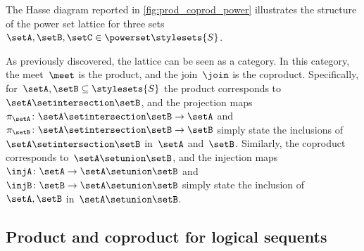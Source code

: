 \begin{marginfigure}
    \centering
    \caption{}
    \label{fig:prod_coprod_power}
\end{marginfigure}

The Hasse diagram reported in \cref{fig:prod_coprod_power} illustrates the structure of the power set lattice for three sets~$\setA,\setB,\setC\in \powerset \stylesets{S}$.

As previously discovered, the lattice can be seen as a category.
In this category, the meet~$\meet$ is the product, and the join~$\join$ is the coproduct.
Specifically, for~$\setA,\setB\subseteq \stylesets{S}$ the product corresponds to~$\setA\setintersection \setB$, and the projection maps~$\pi_\setA\colon \setA\setintersection \setB\to \setA$ and~$\pi_\setB\colon \setA\setintersection \setB\to \setB$ simply state the inclusions of~$\setA\setintersection \setB$ in~$\setA$ and~$\setB$.
Similarly, the coproduct corresponds to~$\setA\setunion \setB$, and the injection maps~$\injA\colon \setA\to \setA\setunion \setB$ and~$\injB\colon \setB\to \setA\setunion \setB$ simply state the inclusion of~$\setA,\setB$ in~$\setA\setunion \setB$.

\subsection{Product and coproduct for logical sequents}
\publictodomessage

